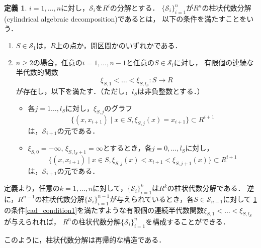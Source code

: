 \documentclass[uplatex, dvipdfmx]{jsarticle}
\numberwithin{equation}{section}
\newcommand{\map}[3]{{#1}\colon{#2}\rightarrow{#3}}
\theoremstyle{definition}
\newtheorem{definition}{定義}[section]
\begin{document}
\begin{definition} \label{definition:cad}
     $i=1, \dots, n$に対し，$\mathcal{S}_i$を$R^i$の分解とする．
     $\{\mathcal{S}_i\}_{i=1}^n$が$R^n$の柱状代数分解(cylindrical algebraic decomposition)であるとは，
     以下の条件を満たすことをいう．
     \begin{enumerate}
          \item $S \in \mathcal{S}_1$は，$R$上の点か，開区間かのいずれかである．
          \item $n\geq 2$の場合，任意の$i=1, \dots, n-1$と任意の$S \in \mathcal{S}_i$に対し，
          有限個の連続な半代数的関数
          \begin{equation}
               \map{\xi_{S,1}< \dots <\xi_{S,l_S}}{S}{R}
          \end{equation}
          が存在し，以下を満たす．（ただし，$l_S$は非負整数とする．）
          \begin{itemize}
               \item 各$j=1 \dots, l_S$に対し，$\xi_{S,j}$のグラフ
               \begin{equation}
                    \{(x,x_{i+1}) \mid x \in S, \xi_{S,j}(x)=x_{i+1} \} \subset R^{i+1}
               \end{equation}
               は，$\mathcal{S}_{i+1}$の元である．
               \item $\xi_{S,0}=-\infty$, $\xi_{S,l_S+1}=\infty$とするとき，各$j=0, \dots, l_S$に対し，\label{cad_condition1}
               \begin{equation}
                    \{(x,x_{i+1}) \mid x \in S, \xi_{S,j}(x)<x_{i+1}<\xi_{S,j+1}(x) \} \subset R^{i+1}
               \end{equation}
               は，$\mathcal{S}_{i+1}$の元である．
          \end{itemize}
     \end{enumerate}
\end{definition}

定義より，任意の$k=1, \dots, n$に対して，$\{\mathcal{S}_i\}_{i=1}^k$は$R^k$の柱状代数分解である．
逆に，$R^{n-1}$の柱状代数分解$\{\mathcal{S}_i\}_{i=1}^{n-1}$が与えられているとき，各$S \in \mathcal{S}_{n-1}$に対して
\cref{definition:cad}の条件\ref{cad_condition1}を満たすような有限個の連続半代数関数$\xi_{S,1}<\dots<\xi_{S,l_S}$が与えられれば，
$R^n$の柱状代数分解$\{\mathcal{S}_i\}_{i=1}^n$を構成することができる．

このように，柱状代数分解は再帰的な構造である．
\end{document}
